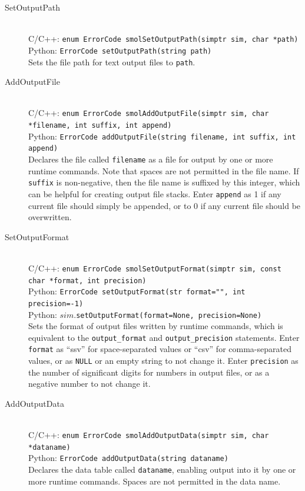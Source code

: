 \documentclass {scrbook}
\newcommand {\ttt} {\texttt}
\begin{document}
\begin{description}

\item[SetOutputPath]
\hfill \\
C/C++: \ttt{enum ErrorCode smolSetOutputPath(simptr sim, char *path)}\\
Python: \ttt{ErrorCode setOutputPath(string path)}\\
Sets the file path for text output files to \ttt{path}.

\item[AddOutputFile]
\hfill \\
C/C++: \ttt{enum ErrorCode smolAddOutputFile(simptr sim, char *filename, int suffix, int append)}\\
Python: \ttt{ErrorCode addOutputFile(string filename, int suffix, int append)}\\
Declares the file called \ttt{filename} as a file for output by one or more runtime commands. Note that spaces are not permitted in the file name. If \ttt{suffix} is non-negative, then the file name is suffixed by this integer, which can be helpful for creating output file stacks. Enter \ttt{append} as 1 if any current file should simply be appended, or to 0 if any current file should be overwritten.

\item[SetOutputFormat]
\hfill \\
C/C++: \ttt{enum ErrorCode smolSetOutputFormat(simptr sim, const char *format, int precision)}\\
Python: \ttt{ErrorCode setOutputFormat(str format="", int precision=-1)}\\
Python: $sim$.\ttt{setOutputFormat(format=None, precision=None)}\\
Sets the format of output files written by runtime commands, which is equivalent to the \ttt{output\_format} and \ttt{output\_precision} statements. Enter \ttt{format} as ``ssv'' for space-separated values or ``csv'' for comma-separated values, or as \ttt{NULL} or an empty string to not change it. Enter \ttt{precision} as the number of significant digits for numbers in output files, or as a negative number to not change it.

\item[AddOutputData]
\hfill \\
C/C++: \ttt{enum ErrorCode smolAddOutputData(simptr sim, char *dataname)}\\
Python: \ttt{ErrorCode addOutputData(string dataname)}\\
Declares the data table called \ttt{dataname}, enabling output into it by one or more runtime commands. Spaces are not permitted in the data name.


\end{description}
\end{document}
